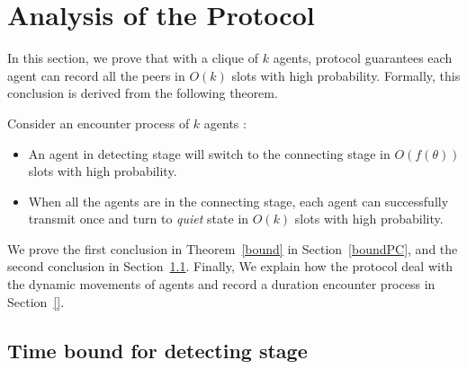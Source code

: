 \section{Analysis of the {\pName} Protocol}
\label{sectionanalysis}

In this section, we prove that with a clique of $k$ agents,  
{\pName} protocol guarantees each agent can record all
the peers in $O(k)$ slots with high probability.
Formally, this conclusion is derived from the following theorem.
\begin{theorem}
    \label{bound}
    Consider an encounter process of $k$ agents :
    \begin{itemize} 
    \item[(1)] An agent in detecting stage  will switch to the connecting stage in $O(f(\theta))$
    slots with high probability.
    \item[(2)] When all the agents are in the connecting stage, each agent can 
    successfully transmit once and turn to \emph{quiet} state in $O(k)$ slots with high probability.
    \end{itemize}
\end{theorem}

We prove the first conclusion in Theorem~\ref{bound} in Section~\ref{boundPC}, and the second
conclusion in Section~\ref{boundSW}. 
Finally, We explain how the {\pName} protocol deal with the dynamic movements
of agents and record a duration encounter process in Section~\ref{}.

\subsection{Time bound for detecting stage}
\label{boundSW}

